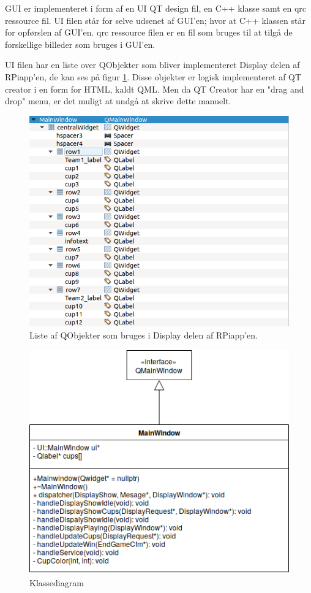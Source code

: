 \documentclass[Softwaredesign/Softwaredesign_main.tex]{subfiles}
\begin{document}
GUI er implementeret i form af en UI QT design fil,  en C++  klasse samt en qrc ressource fil. UI filen står for selve udsenet af GUI'en; hvor at C++ klassen står for opførslen af GUI'en. qrc ressource filen er en fil som bruges til at tilgå de forskellige billeder som bruges i GUI'en. 

UI filen har en liste over QObjekter som bliver implementeret Display delen af RPiapp'en, de kan ses på figur \ref{fig:Qobj_list}. Disse objekter er logisk implementeret af QT creator i en form for HTML, kaldt QML. Men da QT Creator har en "drag and drop" menu, er det muligt at undgå at skrive dette manuelt.  
\begin{figure}[H]
    \centering
    \includegraphics[scale=0.7]{Softwaredesign/GUI/Pictures/Liste_af_Qobjekter.png}
    \caption{Liste af QObjekter som bruges i Display delen af RPiapp'en.}
    \label{fig:Qobj_list}
\end{figure}


\begin{figure}[H]
    \centering
    \includegraphics{Softwaredesign/GUI/Pictures/Mainwindow_klasse.png}
    \caption{Klassediagram}
    \label{fig:Mainwindow_klasse_dia}
\end{figure}
\end{document}
